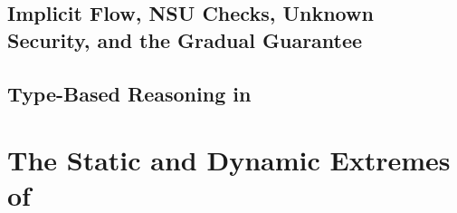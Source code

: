 \subsection{Implicit Flow, NSU Checks, Unknown Security, and the Gradual Guarantee}
\label{sec:example2}


\subsection{Type-Based Reasoning in \Surface}
\label{sec:example3}

\section{The Static and Dynamic Extremes of \Surface}
\label{sec:embedding}
